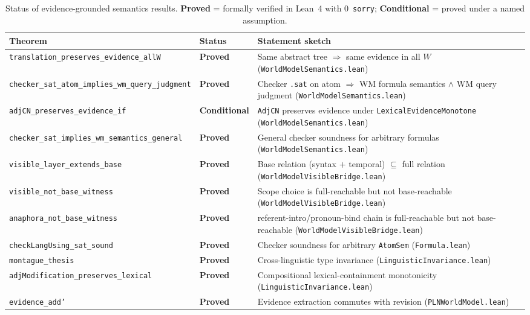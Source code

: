\documentclass[11pt]{article}
\newcommand{\code}[1]{\texttt{#1}}
\begin{document}
\begin{table}[ht]
\centering
\caption{Status of evidence-grounded semantics results.
  \textbf{Proved} = formally verified in Lean~4 with 0~\code{sorry};
  \textbf{Conditional} = proved under a named assumption.}
\label{tab:status}
\small
\begin{tabular}{@{}llp{6.5cm}@{}}
\toprule
\textbf{Theorem} & \textbf{Status} & \textbf{Statement sketch} \\
\midrule
\code{translation\_preserves\_evidence\_allW}
  & \textbf{Proved}
  & Same abstract tree $\Rightarrow$ same evidence in all $W$
    (\code{WorldModelSemantics.lean}) \\
\code{checker\_sat\_atom\_implies\_wm\_query\_judgment}
  & \textbf{Proved}
  & Checker \code{.sat} on atom $\Rightarrow$
    WM formula semantics $\land$ WM query judgment
    (\code{WorldModelSemantics.lean}) \\
\code{adjCN\_preserves\_evidence\_if}
  & \textbf{Conditional}
  & \code{AdjCN} preserves evidence under
    \code{LexicalEvidenceMonotone}
    (\code{WorldModelSemantics.lean}) \\
\code{checker\_sat\_implies\_wm\_semantics\_general}
  & \textbf{Proved}
  & General checker soundness for arbitrary formulas
    (\code{WorldModelSemantics.lean}) \\
\code{visible\_layer\_extends\_base}
  & \textbf{Proved}
  & Base relation (syntax $+$ temporal) $\subseteq$ full relation
    (\code{WorldModelVisibleBridge.lean}) \\
\code{visible\_not\_base\_witness}
  & \textbf{Proved}
  & Scope choice is full-reachable but not base-reachable
    (\code{WorldModelVisibleBridge.lean}) \\
\code{anaphora\_not\_base\_witness}
  & \textbf{Proved}
  & referent-intro/pronoun-bind chain is full-reachable but not base-reachable
    (\code{WorldModelVisibleBridge.lean}) \\
\midrule
\code{checkLangUsing\_sat\_sound}
  & \textbf{Proved}
  & Checker soundness for arbitrary \code{AtomSem}
    (\code{Formula.lean}) \\
\code{montague\_thesis}
  & \textbf{Proved}
  & Cross-linguistic type invariance
    (\code{LinguisticInvariance.lean}) \\
\code{adjModification\_preserves\_lexical}
  & \textbf{Proved}
  & Compositional lexical-containment monotonicity
    (\code{LinguisticInvariance.lean}) \\
\code{evidence\_add'}
  & \textbf{Proved}
  & Evidence extraction commutes with revision
    (\code{PLNWorldModel.lean}) \\
\bottomrule
\end{tabular}
\end{table}
\end{document}

